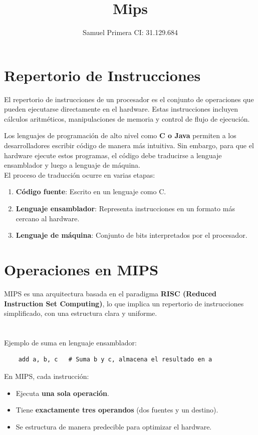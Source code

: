 \documentclass[12pt]{article}
\title{{\Huge \textbf{Mips}}}
\author{Samuel Primera CI: 31.129.684}
\begin{document}
	\maketitle
	
	
	\section{Repertorio de Instrucciones}
	
	El repertorio de instrucciones de un procesador es el conjunto de operaciones que pueden ejecutarse directamente en el hardware. Estas instrucciones incluyen cálculos aritméticos, manipulaciones de memoria y control de flujo de ejecución.
	
	Los lenguajes de programación de alto nivel como \textbf{C o Java} permiten a los desarrolladores escribir código de manera más intuitiva. Sin embargo, para que el hardware ejecute estos programas, el código debe traducirse a lenguaje ensamblador y luego a lenguaje de máquina.
	\\
	
	El proceso de traducción ocurre en varias etapas:
	\begin{enumerate}
		\item \textbf{Código fuente}: Escrito en un lenguaje como C.
		\item \textbf{Lenguaje ensamblador}: Representa instrucciones en un formato más cercano al hardware.
		\item \textbf{Lenguaje de máquina}: Conjunto de bits interpretados por el procesador.
	\end{enumerate}
	
	\section{Operaciones en MIPS}
	
	MIPS es una arquitectura basada en el paradigma \textbf{RISC (Reduced Instruction Set Computing)}, lo que implica un repertorio de instrucciones simplificado, con una estructura clara y uniforme.
	\\\\\\
	Ejemplo de suma en lenguaje ensamblador:
	\begin{lstlisting}
	add a, b, c   # Suma b y c, almacena el resultado en a
	\end{lstlisting}
	En MIPS, cada instrucción:
	\begin{itemize}
		\item Ejecuta \textbf{una sola operación}.
		\item Tiene \textbf{exactamente tres operandos} (dos fuentes y un destino).
		\item Se estructura de manera predecible para optimizar el hardware.
	\end{itemize}
	
\end{document}
